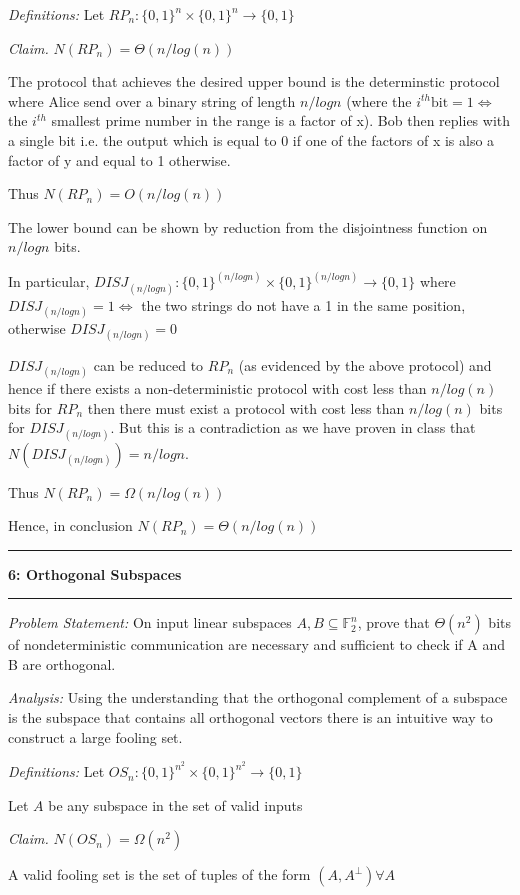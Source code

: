 \documentclass[11pt]{article}
\newcommand\question[2]{\vspace{.25in}\hrule\textbf{#1: #2}\vspace{.5em}\hrule\vspace{.10in}}
\newcommand\analysis{\vspace{.10in}\emph{Analysis: }\newline}
\newcommand\problem{\emph{Problem Statement:}\newline}
\newcommand\definitions{\emph{Definitions:}\newline}
\newcommand\claim{\emph{Claim.}\newline}
\begin{document}
\definitions
Let $RP_n: {\{0, 1\}}^n \times {\{0, 1\}}^n \to \{0, 1\}$

\claim
$N(RP_n) = \Theta(n/log(n))$ 

\proof 
The protocol that achieves the desired upper bound is the determinstic protocol where Alice send over a binary string of length $n/logn$ (where the $i^{th} \text{bit} = 1 \iff$ the $i^{th}$ smallest prime number in the range is a factor of x). Bob then replies with a single bit i.e. the output which is equal to 0 if one of the factors of x is also a factor of y and equal to 1 otherwise. 

Thus $N(RP_n) = O(n/log(n))$

The lower bound can be shown by reduction from the disjointness function on $n/logn$ bits. 

In particular, $DISJ_{(n/logn)}: {\{0, 1\}}^{(n/logn)} \times {\{0, 1\}}^{(n/logn)} \to \{0, 1\}$ where $DISJ_{(n/logn)} = 1 \iff$ the two strings do not have a 1 in the same position, otherwise $DISJ_{(n/logn)} = 0$

$DISJ_{(n/logn)}$ can be reduced to $RP_n$ (as evidenced by the above protocol) and hence if there exists a non-deterministic protocol with cost less than $n/log(n)$ bits for $RP_n$ then there must exist a protocol with cost less than $n/log(n)$ bits for $DISJ_{(n/logn)}$. But this is a contradiction as we have proven in class that $N(DISJ_{(n/logn)}) = n/logn$.

Thus $N(RP_n) = \Omega(n/log(n))$

Hence, in conclusion $N(RP_n) = \Theta(n/log(n))$

\newpage

\question{6}{Orthogonal Subspaces}

\problem
On input linear subspaces $A, B \subseteq \mathbb{F}_2^n$, prove that $\Theta(n^2)$ bits of nondeterministic communication are necessary and sufficient to check if A and B are orthogonal.

\analysis
Using the understanding that the orthogonal complement of a subspace is the subspace that contains all orthogonal vectors there is an intuitive way to construct a large fooling set. 

\definitions
Let $OS_n: {\{0, 1\}}^{n^2} \times {\{0, 1\}}^{n^2} \to \{0, 1\}$

Let $A$ be any subspace in the set of valid inputs

\claim
$N(OS_n) = \Omega(n^2)$ 

\proof 
A valid fooling set is the set of tuples of the form $(A, A^{\perp}) \forall A$
\end{document}
